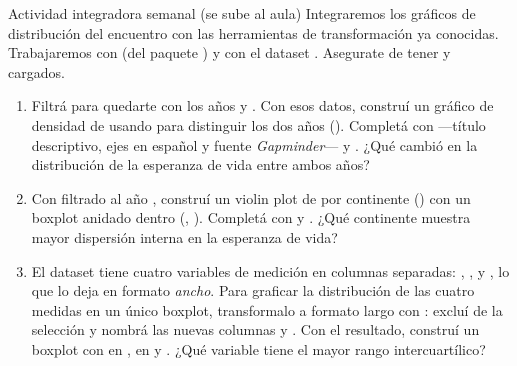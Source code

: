 \documentclass[8pt]{beamer}
\begin{document}
	\begin{frame}[fragile]{Actividad integradora semanal (se sube al aula)}
		Integraremos los gráficos de distribución del encuentro con las herramientas de transformación ya conocidas. Trabajaremos con  (del paquete ) y con el dataset . Asegurate de tener  y  cargados.

		\begin{enumerate}
			\item Filtrá  para quedarte con los años  y . Con esos datos, construí un gráfico de densidad de  usando  para distinguir los dos años (). Completá con  ---título descriptivo, ejes en español y fuente \textit{Gapminder}--- y . ¿Qué cambió en la distribución de la esperanza de vida entre ambos años?

			\item Con  filtrado al año , construí un violin plot de  por continente () con un boxplot anidado dentro (, ). Completá con  y . ¿Qué continente muestra mayor dispersión interna en la esperanza de vida?

			\item El dataset  tiene cuatro variables de medición en columnas separadas: , ,  y , lo que lo deja en formato \textit{ancho}. Para graficar la distribución de las cuatro medidas en un único boxplot, transformalo a formato largo con : excluí  de la selección y nombrá las nuevas columnas  y . Con el resultado, construí un boxplot con  en ,  en  y . ¿Qué variable tiene el mayor rango intercuartílico?
		\end{enumerate}
	\end{frame}
\end{document}
